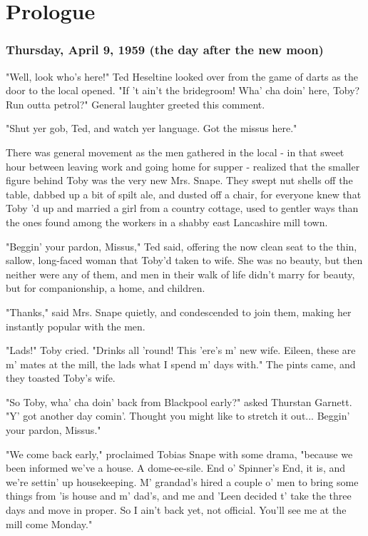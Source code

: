 

\chapter{Prologue}

\subsection{Thursday, April 9, 1959 (the day after the new moon)}

"Well, look who's here!" Ted Heseltine looked over from the game of darts as the door to the local opened. "If 't ain't the bridegroom! Wha' cha doin' here, Toby? Run outta petrol?" General laughter greeted this comment.

"Shut yer gob, Ted, and watch yer language. Got the missus here."

There was general movement as the men gathered in the local - in that sweet hour between leaving work and going home for supper - realized that the smaller figure behind Toby was the very new Mrs. Snape. They swept nut shells off the table, dabbed up a bit of spilt ale, and dusted off a chair, for everyone knew that Toby 'd up and married a girl from a country cottage, used to gentler ways than the ones found among the workers in a shabby east Lancashire mill town.

"Beggin' your pardon, Missus," Ted said, offering the now clean seat to the thin, sallow, long-faced woman that Toby'd taken to wife. She was no beauty, but then neither were any of them, and men in their walk of life didn't marry for beauty, but for companionship, a home, and children.

"Thanks," said Mrs. Snape quietly, and condescended to join them, making her instantly popular with the men.

"Lads!" Toby cried. "Drinks all 'round! This 'ere's m' new wife. Eileen, these are m' mates at the mill, the lads what I spend m' days with." The pints came, and they toasted Toby's wife.

"So Toby, wha' cha doin' back from Blackpool early?" asked Thurstan Garnett. "Y' got another day comin'. Thought you might like to stretch it out... Beggin' your pardon, Missus."

"We come back early," proclaimed Tobias Snape with some drama, "because we been informed we've a house. A dome-ee-sile. End o' Spinner's End, it is, and we're settin' up housekeeping. M' grandad's hired a couple o' men to bring some things from 'is house and m' dad's, and me and 'Leen decided t' take the three days and move in proper. So I ain't back yet, not official. You'll see me at the mill come Monday."

